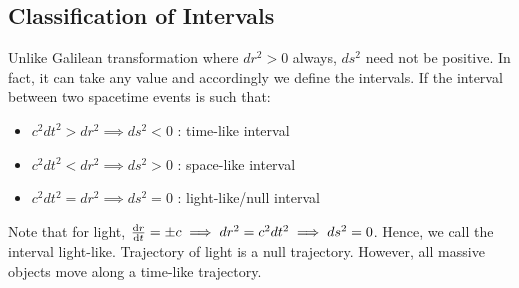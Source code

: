    \subsection{Classification of Intervals}
   Unlike Galilean transformation where $dr^2>0$ always, $ds^2$ need not be positive. In fact, it can take any value and accordingly we define the intervals. If the interval between two spacetime events is such that:
   \begin{itemize}
    \item $c^2dt^2>dr^2 \implies ds^2<0$ : time-like interval
    \item $c^2dt^2<dr^2 \implies ds^2>0$ : space-like interval
    \item $c^2dt^2=dr^2 \implies ds^2=0$ : light-like/null interval
   \end{itemize}
   Note that for light, $\dv{r}{t} = \pm c\implies dr^2 = c^2dt^2 \implies ds^2 =0$. Hence, we call the interval light-like. Trajectory of light is a null trajectory. However, all massive objects move along a time-like trajectory.